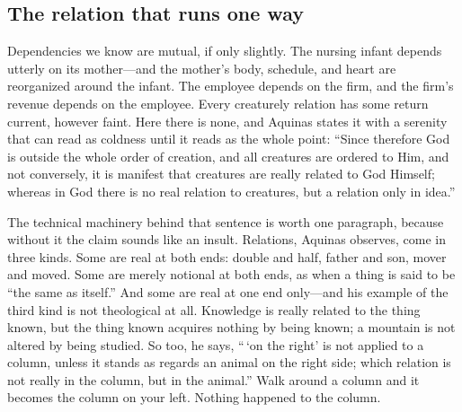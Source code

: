 \subsection{The relation that runs one way}

Dependencies we know are mutual, if only slightly. The nursing infant depends utterly on its mother---and the mother's body, schedule, and heart are reorganized around the infant. The employee depends on the firm, and the firm's revenue depends on the employee. Every creaturely relation has some return current, however faint. Here there is none, and Aquinas states it with a serenity that can read as coldness until it reads as the whole point: ``Since therefore God is outside the whole order of creation, and all creatures are ordered to Him, and not conversely, it is manifest that creatures are really related to God Himself; whereas in God there is no real relation to creatures, but a relation only in idea.''

The technical machinery behind that sentence is worth one paragraph, because without it the claim sounds like an insult. Relations, Aquinas observes, come in three kinds. Some are real at both ends: double and half, father and son, mover and moved. Some are merely notional at both ends, as when a thing is said to be ``the same as itself.'' And some are real at one end only---and his example of the third kind is not theological at all. Knowledge is really related to the thing known, but the thing known acquires nothing by being known; a mountain is not altered by being studied. So too, he says, ``\,`on the right' is not applied to a column, unless it stands as regards an animal on the right side; which relation is not really in the column, but in the animal.'' Walk around a column and it becomes the column on your left. Nothing happened to the column.

